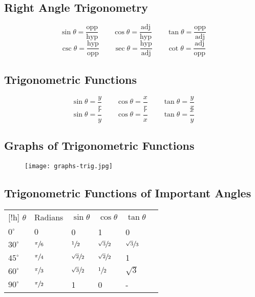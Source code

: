 \subsection{Right Angle Trigonometry}
\[
  \sin \theta = \frac{\text{opp}}{\text{hyp}} \qquad
  \cos \theta = \frac{\text{adj}}{\text{hyp}} \qquad
  \tan \theta = \frac{\text{opp}}{\text{adj}}
\]
\[
  \csc \theta = \frac{\text{hyp}}{\text{opp}} \qquad
  \sec \theta = \frac{\text{hyp}}{\text{adj}} \qquad
  \cot \theta = \frac{\text{adj}}{\text{opp}}
\]

\subsection{Trigonometric Functions}

\[
  \sin \theta = \frac yr \qquad
  \cos \theta = \frac xr \qquad
  \tan \theta = \frac yx
\]
\[
  \sin \theta = \frac ry \qquad
  \cos \theta = \frac rx \qquad
  \tan \theta = \frac xy
\]
  \begin{center}
  \end{center}

\subsection{Graphs of Trigonometric Functions}
\begin{figure}[h!]
    \centering
    \texttt{[image: graphs-trig.jpg]}
\end{figure}

\subsection{Trigonometric Functions of Important Angles}

\begin{center}
  \begin{tabular}{llllll}[!h]
    $\theta$ & Radians & $\sin \theta$ & $\cos \theta$ & $\tan \theta$\\[0.3cm]
    $0^{\circ}$ & $0$ & 0 & 1 & 0 \\[0.3cm]
    $30^{\circ}$ & $\sfrac{\pi}6$ & $\sfrac12$ & $\sfrac{\sqrt 3}2$ & $\sfrac{\sqrt 3}3$ \\[0.3cm]
    $45^{\circ}$ & $\sfrac{\pi}4$ & $\sfrac{\sqrt 2}2$ & $\sfrac{\sqrt 2}2$ & 1 \\[0.3cm]
    $60^{\circ}$ & $\sfrac{\pi}3$ & $\sfrac{\sqrt 3}2$ & $\sfrac12$ & $\sqrt 3$ \\[0.3cm]
    $90^{\circ}$ & $\sfrac{\pi}2$ & 1 & 0 & - \\[0.3cm]
  \end{tabular}
\end{center}

